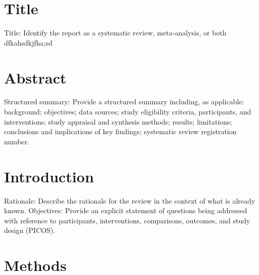 \documentclass{article}\usepackage[]{graphicx}\usepackage[]{color}
\begin{document}
\section{Title}


Title: Identify the report as a systematic review, meta-analysis, or both dfkahsdkjfha;sd

\section{Abstract}

Structured summary: Provide a structured summary including, as applicable: background; objectives; data sources; study eligibility criteria, participants, and interventions; study appraisal and synthesis methods; results; limitations; conclusions and implications of key findings; systematic review registration number.

\section{Introduction}

Rationale: Describe the rationale for the review in the context of what is already known. Objectives: Provide an explicit statement of questions being addressed with reference to participants, interventions, comparisons, outcomes, and study design (PICOS).

\section{Methods}
\end{document}
